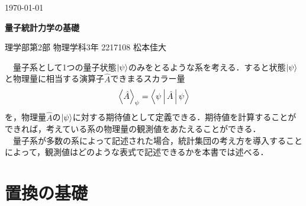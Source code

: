 \documentclass[12pt]{jsarticle}\usepackage{ifthen}\newboolean{enlarge}\setboolean{enlarge}{false}
\begin{document}
\begin{flushright}
\footnotesize
\today
\end{flushright}
\noindent
{\bf
\Large 量子統計力学の基礎}
\begin{flushright}
理学部第2部 物理学科3年 2217108 松本佳大

\end{flushright}
　量子系として1つの量子状態$\ket{\psi}$のみをとるような系を考える．すると状態$\ket{\psi}$と物理量に相当する演算子$\hat{A}$できまるスカラー量
\begin{align}
\label{ev}
\Braket{\hat{A}}_{\psi}=\Braket{\psi|\hat{A}|\psi}
\end{align}
を，物理量$\hat{A}$の$\ket{\psi}$に対する期待値として定義できる．期待値を計算することができれば，考えている系の物理量の観測値をあたえることができる．\\
　量子系が多数の系によって記述された場合，統計集団の考え方を導入することによって，観測値はどのような表式で記述できるかを本書では述べる．



%
\section{置換の基礎}
\end{document}
